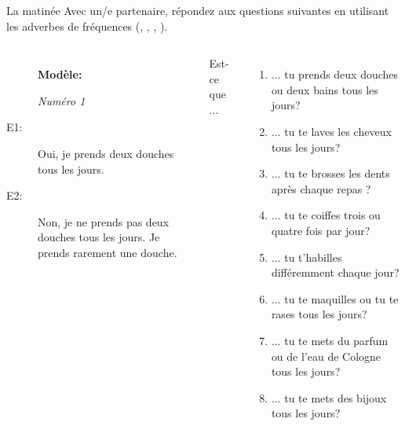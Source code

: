 \begin{frame}{La matinée}
  \small
  Avec un/e partenaire, répondez aux questions suivantes en utilisant les adverbes de fréquences (, , , ). \\
  \begin{columns}
    \scriptsize
      \begin{description}
        \item[] \textbf{Modèle:}
        \item[] \emph{Numéro 1}
        \item[E1:] Oui, je prends deux douches tous les jours.
        \item[] 
        \item[E2:] Non, je ne prends pas deux douches tous les jours. Je prends rarement une douche.
        \item[] 
      \end{description}
      Est-ce que ...
      \begin{enumerate}
        \item ... tu prends deux douches ou deux bains tous les jours?
        \item ... tu te laves les cheveux tous les jours?
        \item ... tu te brosses les dents après chaque repas ?
        \item ... tu te coiffes trois ou quatre fois par jour?
        \item ... tu t'habilles différemment chaque jour?
        \item ... tu te maquilles ou tu te rases tous les jours?
        \item ... tu te mets du parfum ou de l'eau de Cologne tous les jours?
        \item ... tu te mets des bijoux  tous les jours?
      \end{enumerate}
  \end{columns}
\end{frame}